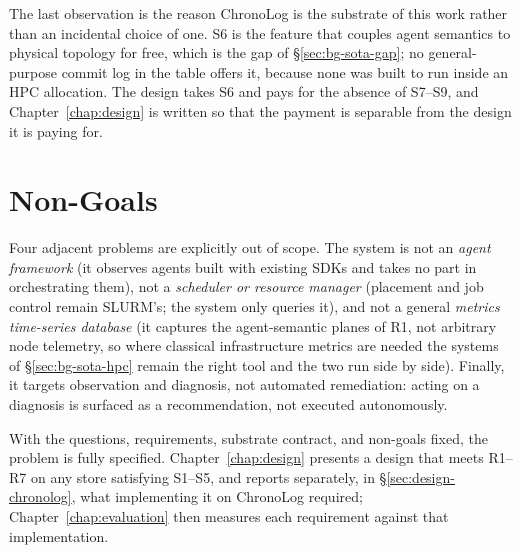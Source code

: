 The last observation is the reason ChronoLog is the substrate of this work
rather than an incidental choice of one. S6 is the feature that couples
agent semantics to physical topology for free, which is the gap of
\S\ref{sec:bg-sota-gap}; no general-purpose commit log in the table offers
it, because none was built to run inside an HPC allocation. The design
takes S6 and pays for the absence of S7--S9, and
Chapter~\ref{chap:design} is written so that the payment is separable
from the design it is paying for.

\section{Non-Goals}
\label{sec:problem-nongoals}

Four adjacent problems are explicitly out of scope. The system is not an
\emph{agent framework} (it observes agents built with existing SDKs and
takes no part in orchestrating them), not a \emph{scheduler or resource
manager} (placement and job control remain SLURM's; the system only queries
it), and not a general \emph{metrics time-series database} (it captures the
agent-semantic planes of R1, not arbitrary node telemetry, so where
classical infrastructure metrics are needed the systems of
\S\ref{sec:bg-sota-hpc} remain the right tool and the two run side by
side). Finally, it targets observation and diagnosis, not automated
remediation: acting on a diagnosis is surfaced as a recommendation, not
executed autonomously.

With the questions, requirements, substrate contract, and non-goals
fixed, the problem is fully specified. Chapter~\ref{chap:design} presents
a design that meets R1--R7 on any store satisfying S1--S5, and reports
separately, in \S\ref{sec:design-chronolog}, what implementing it on
ChronoLog required; Chapter~\ref{chap:evaluation} then measures each
requirement against that implementation.
